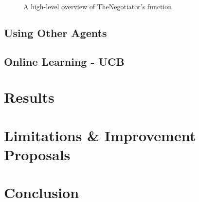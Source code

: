 \documentclass[12pt]{article}
\numberwithin{equation}{section}
\begin{document}
			\begin{figure}[H]
				\centering
				\captionsetup{justification=centering}
				\caption{A high-level overview of TheNegotiator's function}
				\label{fig:high_level_overview}
			\end{figure}

		\subsection{Using Other Agents}		\label{sec:implementation.using_other_agents}
			
			\paragraph{}

		
		
		
		\subsection{Online Learning - UCB}		\label{sec:implementation.ucb}

	\section{Results}		\label{sec:results}	%

	\section{Limitations \& Improvement Proposals}		\label{sec:limitations_improvements}

	\section{Conclusion}		\label{sec:conclusion}


	
	
\end{document}
